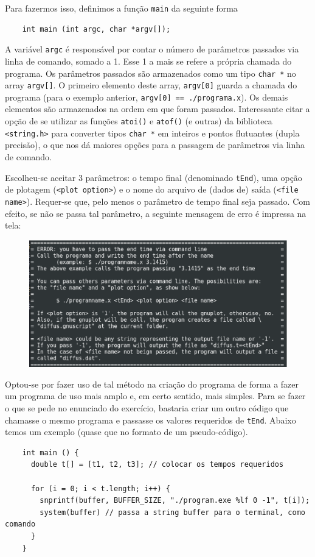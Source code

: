   Para fazermos isso, definimos a função \texttt{main} da seguinte forma
  \begin{lstlisting}
    int main (int argc, char *argv[]);
  \end{lstlisting}
  A variável \texttt{argc} é responsável por contar o número de parâmetros passados via linha de comando, somado a 1. Esse 1 a mais se refere a própria chamada do programa. Os parâmetros passados são armazenados como um tipo \texttt{char *} no array \texttt{argv[]}. O primeiro elemento deste array, \texttt{argv[0]} guarda a chamada do programa (para o exemplo anterior, \texttt{argv[0] == ./programa.x}). Os demais elementos são armazenados na ordem em que foram passados.
  Interessante citar a opção de se utilizar as funções \texttt{atoi()} e \texttt{atof()} (e outras) da biblioteca \texttt{<string.h>} para converter tipos \texttt{char *} em inteiros e pontos flutuantes (dupla precisão), o que nos dá maiores opções para a passagem de parâmetros via linha de comando.

  Escolheu-se aceitar 3 parâmetros: o tempo final (denominado \texttt{tEnd}), uma opção de plotagem (\texttt{<plot option>}) e o nome do arquivo de (dados de) saída (\texttt{<file name>}). Requer-se que, pelo menos o parâmetro de tempo final seja passado. Com efeito, se não se passa tal parâmetro, a seguinte mensagem de erro é impressa na tela:
  \begin{figure}[h]
    \center
    \includegraphics[scale = .35]{outputq4}
  \end{figure}


  \newpage
  Optou-se por fazer uso de tal método na criação do programa de forma a fazer um programa de uso mais amplo e, em certo sentido, mais simples. Para se fazer o que se pede no enunciado do exercício, bastaria criar um outro código que chamasse o mesmo programa e passasse os valores requeridos de \texttt{tEnd}. Abaixo temos um exemplo (quase que no formato de um pseudo-código).
  \begin{lstlisting}
    int main () {
      double t[] = [t1, t2, t3]; // colocar os tempos requeridos

      for (i = 0; i < t.length; i++) {
        snprintf(buffer, BUFFER_SIZE, "./program.exe %lf 0 -1", t[i]);
        system(buffer) // passa a string buffer para o terminal, como comando
      }
    }
  \end{lstlisting}

